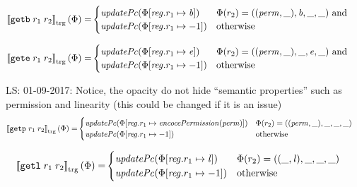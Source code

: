 \documentclass[a4paper]{article}
\newcommand\lau[1]{{\color{purple} \sf \footnotesize {LS: #1}}\\}
\newcommand{\sem}[1]{\left\llbracket #1 \right\rrbracket}
\newcommand{\tsem}[2][\Phi]{\sem{#2}_{\mathrm{trg}}(#1)}
\newcommand{\tand}{\text{ and }}
\newcommand{\totherwise}{\text{otherwise }}
\newcommand{\targetcolor}[1]{\color{black}}
\newcommand{\trg}[1]{{\targetcolor{} #1}}
\newcommand{\zinstr}[1]{\texttt{#1}}
\newcommand{\twoinstr}[3]{
  \ifthenelse{\equal{#2#3}{}}
  {\zinstr{#1}}
  {\zinstr{#1} \; #2 \; #3}
}
\newcommand{\tgetb}[2]{\twoinstr{\trg{getb}}{#1}{#2}}
\newcommand{\tgete}[2]{\twoinstr{\trg{gete}}{#1}{#2}}
\newcommand{\tgetp}[2]{\twoinstr{\trg{getp}}{#1}{#2}}
\newcommand{\tgetlin}[2]{\twoinstr{\trg{getl}}{#1}{#2}}
\newcommand{\update}[2]{[#1 \mapsto #2]}
\newcommand{\updReg}[2]{\update{\reg.#1}{#2}}
\newcommand{\perm}{\var{perm}}
\newcommand{\lin}{\var{l}}
\newcommand{\var}[1]{\mathit{#1}}
\newcommand{\reg}{\var{reg}}
\newcommand{\baddr}{\var{b}}
\newcommand{\eaddr}{\var{e}}
\newcommand{\plainfun}[2]{
  \ifthenelse{\equal{#2}{}}
  {\mathit{#1}}
  {\mathit{#1}(#2)}
}
\newcommand{\encPerm}[1]{\plainfun{encocePermission}{#1}}
\newcommand{\updPcAddr}[1]{\plainfun{updatePc}{#1}}
\begin{document}
\begin{align*}
  \tsem{\tgetb{r_1}{r_2}} = &
                              \begin{cases}
                                \updPcAddr{\Phi\update{\reg.r_1}{\baddr}} & 
                                \arraycolsep=0pt
                                \begin{array}[t]{l}
                                  \Phi(r_2) = ((\perm,\_),\baddr,\_,\_) \tand \\
                                \end{array} \\
                                \updPcAddr{\Phi\updReg{r_1}{-1}} & \totherwise
                              \end{cases}
\end{align*}

\begin{align*}
  \tsem{\tgete{r_1}{r_2}} = &
                              \begin{cases}
                                \updPcAddr{\Phi\update{\reg.r_1}{\eaddr}} & 
                                \arraycolsep=0pt
                                \begin{array}[t]{l}
                                  \Phi(r_2) = ((\perm,\_),\_,\eaddr,\_) \tand \\
                                \end{array} \\
                                \updPcAddr{\Phi\updReg{r_1}{-1}} & \totherwise
                              \end{cases}
\end{align*}

\lau{01-09-2017: Notice, the opacity do not hide ``semantic properties'' such as permission and linearity (this could be changed if it is an issue)}

\begin{align*}
  \tsem{\tgetp{r_1}{r_2}} = & 
                              \begin{cases}
                                \updPcAddr{}(\Phi\update{\reg.r_1}{\encPerm{\perm}}) & \Phi(r_2) = ((\perm,\_),\_,\_,\_)\\
                                \updPcAddr{\Phi\updReg{r_1}{-1}} & \totherwise
                              \end{cases}
\end{align*}

\begin{align*}
  \tsem{\tgetlin{r_1}{r_2}} = &                              
                              \begin{cases}
                                \updPcAddr{}(\Phi\update{\reg.r_1}{\lin}) & \Phi(r_2) = ((\_,\lin),\_,\_,\_) \\
                                \updPcAddr{\Phi\updReg{r_1}{-1}} & \totherwise
                              \end{cases}
\end{align*}
\end{document}
